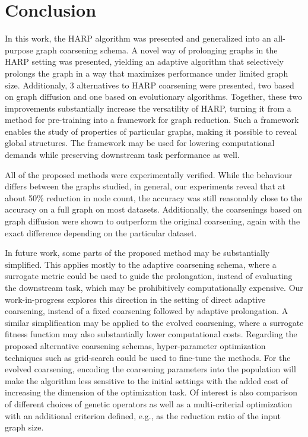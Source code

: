 \section{Conclusion}

In this work, the HARP algorithm was presented and generalized into an all-purpose graph coarsening schema. A novel way of prolonging graphs in the HARP setting was presented, yielding an adaptive algorithm that selectively prolongs the graph in a way that maximizes performance under limited graph size. Additionaly, 3 alternatives to HARP coarsening were presented, two based on graph diffusion and one based on evolutionary algorithms. Together, these two improvements substantially increase the versatility of HARP, turning it from a method for pre-training into a framework for graph reduction. Such a framework enables the study of properties of particular graphs, making it possible to reveal global structures. The framework may be used for lowering computational demands while preserving downstream task performance as well.

All of the proposed methods were experimentally verified. While the behaviour differs between the graphs studied, in general, our experiments reveal that at about 50\% reduction in node count, the accuracy was still reasonably close to the accuracy on a full graph on most datasets. Additionally, the coarsenings based on graph diffusion were shown to outperform the original coarsening, again with the exact difference depending on the particular dataset.

In future work, some parts of the proposed method may be substantially simplified. This applies mostly to the adaptive coarsening schema, where a surrogate metric could be used to guide the prolongation, instead of evaluating the downstream task, which may be prohibitively computationally expensive. Our work-in-progress \cite{prochazka_downstream_2022} explores this direction in the setting of direct adaptive coarsening, instead of a fixed coarsening followed by adaptive prolongation. A similar simplification may be applied to the evolved coarsening, where a surrogate fitness function may also substantially lower computational costs. Regarding the proposed alternative coarsening schemas, hyper-parameter optimization techniques such as grid-search could be used to fine-tune the methods. For the evolved coarsening, encoding the coarsening parameters into the population will make the algorithm less sensitive to the initial settings with the added cost of increasing the dimension of the optimization task. Of interest is also comparison of different choices of genetic operators as well as a multi-criterial optimization with an additional criterion defined, e.g., as the reduction ratio of the input graph size.
